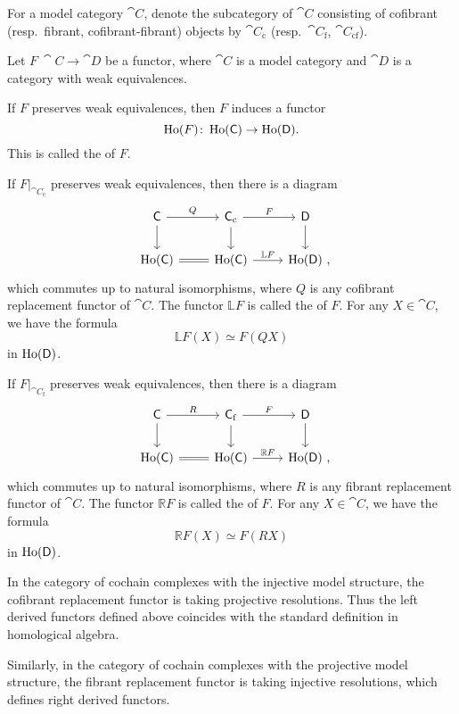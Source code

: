 For a model category $\cat C$,
denote the subcategory of $\cat C$
consisting of cofibrant (resp.\ fibrant, cofibrant-fibrant) objects
by $\cat C_{\mathrm c}$ (resp.\ $\cat C_{\mathrm f}$, $\cat C_{\mathrm{cf}}$).

\begin{definition}
    Let $F\:\cat C\to\cat D$ be a functor,
    where $\cat C$ is a model category and 
    $\cat D$ is a category with weak equivalences.
    \begin{itms}
        \item If $F$ preserves weak equivalences, then $F$ induces a functor
        \[ \operatorname{Ho}(F)\colon\operatorname{Ho}(\mathsf{C})\to\operatorname{Ho}(\mathsf{D}). \]
        This is called the  of $F$.
        \item If $F|_{\cat C_{\mathrm c}}$ preserves weak equivalences,
        then there is a diagram
        \[\begin{tikzcd}
            \cat C\ar[d]\ar[r,"Q"] & \cat C_{\mathrm c}\ar[d]\ar[r,"F"] & \cat D\ar[d] \\
            \Ho(\cat C)\ar[r,equals] & \Ho(\cat C)\ar[r,"\mathbb LF"]
            & \Ho(\cat D)\rlap{\ ,}
        \end{tikzcd}\]
        which commutes up to natural isomorphisms,
        where $Q$ is any cofibrant replacement functor of $\cat C$.
        The functor $\mathbb LF$ is called the  of $F$.
        For any $X\in\cat C$, we have the formula
        \[ \mathbb LF(X)\simeq F(QX) \]
        in $\operatorname{Ho}(\mathsf{D})$.
        \item If $F|_{\cat C_{\mathrm f}}$ preserves weak equivalences,
        then there is a diagram
        \[\begin{tikzcd}
            \cat C\ar[d]\ar[r,"R"] & \cat C_{\mathrm f}\ar[d]\ar[r,"F"] & \cat D\ar[d] \\
            \Ho(\cat C)\ar[r,equals] & \Ho(\cat C)\ar[r,"\mathbb RF"]
            & \Ho(\cat D)\rlap{\ ,}
        \end{tikzcd}\]
        which commutes up to natural isomorphisms,
        where $R$ is any fibrant replacement functor of $\cat C$.
        The functor $\mathbb RF$ is called the  of $F$.
        For any $X\in\cat C$, we have the formula
        \[ \mathbb RF(X)\simeq F(RX) \]
        in $\operatorname{Ho}(\mathsf{D})$.
    \end{itms}
\end{definition}

\begin{example}
    In the category of cochain complexes with the injective model structure,
    the cofibrant replacement functor is taking projective resolutions.
    Thus the left derived functors defined above coincides with
    the standard definition in homological algebra.

    Similarly, in the category of cochain complexes with the projective model structure,
    the fibrant replacement functor is taking injective resolutions,
    which defines right derived functors. \varqed
\end{example}

